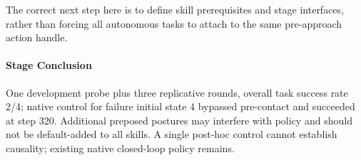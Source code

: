 The correct next step here is to define skill prerequisites and stage interfaces, rather than forcing all autonomous tasks to attach to the same pre-approach action handle.


\paragraph{Stage Conclusion} One development probe plus three replicative rounds, overall task success rate 2/4; native control for failure initial state 4 bypassed pre-contact and succeeded at step 320. Additional preposed postures may interfere with policy and should not be default-added to all skills. A single post-hoc control cannot establish causality; existing native closed-loop policy remains.



\FloatBarrier

